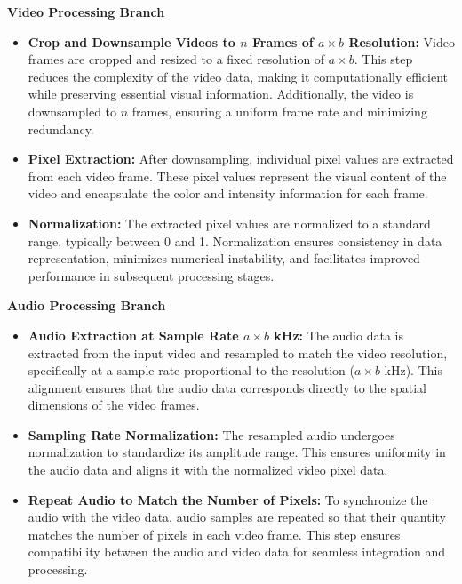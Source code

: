         \textbf{Video Processing Branch}
        \begin{itemize}
            \item \textbf{Crop and Downsample Videos to \(n\) Frames of \(a \times b\) Resolution:} 
            Video frames are cropped and resized to a fixed resolution of \(a \times b\). This step reduces the complexity of the video data, making it computationally efficient while preserving essential visual information. Additionally, the video is downsampled to \(n\) frames, ensuring a uniform frame rate and minimizing redundancy.
        
            \item \textbf{Pixel Extraction:} 
            After downsampling, individual pixel values are extracted from each video frame. These pixel values represent the visual content of the video and encapsulate the color and intensity information for each frame.
        
            \item \textbf{Normalization:} 
            The extracted pixel values are normalized to a standard range, typically between 0 and 1. Normalization ensures consistency in data representation, minimizes numerical instability, and facilitates improved performance in subsequent processing stages.
        \end{itemize}
        
        \textbf{Audio Processing Branch}
        \begin{itemize}
            \item \textbf{Audio Extraction at Sample Rate \(a \times b\) kHz:} 
            The audio data is extracted from the input video and resampled to match the video resolution, specifically at a sample rate proportional to the resolution (\(a \times b\) kHz). This alignment ensures that the audio data corresponds directly to the spatial dimensions of the video frames.
        
            \item \textbf{Sampling Rate Normalization:} 
            The resampled audio undergoes normalization to standardize its amplitude range. This ensures uniformity in the audio data and aligns it with the normalized video pixel data.
        
            \item \textbf{Repeat Audio to Match the Number of Pixels:} 
            To synchronize the audio with the video data, audio samples are repeated so that their quantity matches the number of pixels in each video frame. This step ensures compatibility between the audio and video data for seamless integration and processing.
        \end{itemize}
        
